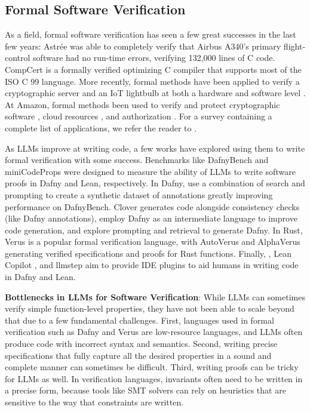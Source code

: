 \subsection{Formal Software Verification}

 As a field, formal software verification has seen a few great successes in the last few years: Astrée \citep{cousot2005astree} was able to completely verify that Airbus A340's primary flight-control software had no run-time errors, verifying 132,000 lines of C code. 
CompCert \citep{leroy2016compcert} is a formally verified optimizing C compiler that supports most of the ISO C 99 language. More recently, formal methods have been applied to verify a cryptographic server \citep{erbsen2024foundational} and an IoT lightbulb at both a hardware and software level \citep{erbsen2021integration}. At Amazon, formal methods been used to verify and protect cryptographic software \citep{goel2024leanprover}, cloud resources \citep{xu2024cloud}, and authorization \citep{disselkoen2025cedar}. For a survey containing a complete list of applications, we refer the reader to \citet{huang2023lessons}.

As LLMs improve at writing code, a few works have explored using them to write formal verification with some success. Benchmarks like DafnyBench \citep{loughridge2024dafnybench} and miniCodeProps \citep{lohn2024minicodeprops} were designed to measure the ability of LLMs to write software proofs in Dafny and Lean, respectively. In Dafny, \citet{poesia2024dafny} use a combination of search and prompting to create a synthetic dataset of annotations greatly improving performance on DafnyBench. Clover \citep{sun2024clover} generates code alongside consistency checks (like Dafny annotations), \citet{li2025dafny} employ Dafny as an intermediate language to improve code generation, and \citet{misu2024towards} explore prompting and retrieval to generate Dafny. In Rust, Verus is a popular formal verification language, with AutoVerus \citep{yang2024autoverus} and AlphaVerus \citep{aggarwal2024alphaverus} generating verified specifications and proofs for Rust functions. Finally, \citet{silva2024leveraging}, Lean Copilot \citep{song2024towards}, and llmstep \citep{welleck2023llmstep} aim to provide IDE plugins to aid humans in writing code in Dafny and Lean.


\textbf{Bottlenecks in LLMs for Software Verification}: While LLMs can sometimes verify simple function-level properties, they have not been able to scale beyond that due to a few fundamental challenges. First, languages used in formal verification such as Dafny and Verus are low-resource languages, and LLMs often produce code with incorrect syntax and semantics. Second, writing precise specifications that fully capture all the desired properties in a sound and complete manner can sometimes be difficult. Third, writing proofs can be tricky for LLMs as well. In verification languages, invariants often need to be written in a precise form, because tools like SMT solvers can rely on heuristics that are sensitive to the way that constraints are written.


